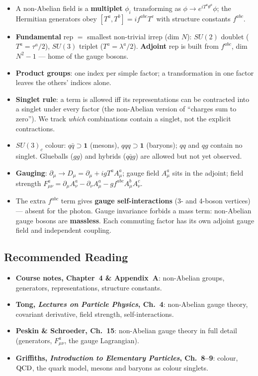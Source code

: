 \documentclass[../main.tex]{subfiles}
\begin{document}
\begin{itemize}
  \item A non-Abelian field is a \textbf{multiplet} $\phi_i$ transforming as $\phi\to e^{iT^a\theta^a}\phi$; the Hermitian generators obey $[T^a,T^b]=if^{abc}T^c$ with structure constants $f^{abc}$.
  \item \textbf{Fundamental} rep $=$ smallest non-trivial irrep (dim $N$): $SU(2)$ doublet ($T^a=\tau^a/2$), $SU(3)$ triplet ($T^a=\lambda^a/2$). \textbf{Adjoint} rep is built from $f^{abc}$, dim $N^2-1$ --- home of the gauge bosons.
  \item \textbf{Product groups}: one index per simple factor; a transformation in one factor leaves the others' indices alone.
  \item \textbf{Singlet rule}: a term is allowed iff its representations can be contracted into a singlet under every factor (the non-Abelian version of ``charges sum to zero''). We track \emph{which} combinations contain a singlet, not the explicit contractions.
  \item $SU(3)_c$ colour: $q\bar q\supset\mathbf1$ (mesons), $qqq\supset\mathbf1$ (baryons); $qq$ and $qg$ contain no singlet. Glueballs ($gg$) and hybrids ($q\bar q g$) are allowed but not yet observed.
  \item \textbf{Gauging}: $\partial_\mu\to D_\mu=\partial_\mu+igT^aA_\mu^a$; gauge field $A_\mu^a$ sits in the adjoint; field strength $F_{\mu\nu}^a=\partial_\mu A_\nu^a-\partial_\nu A_\mu^a-gf^{abc}A_\mu^bA_\nu^c$.
  \item The extra $f^{abc}$ term gives \textbf{gauge self-interactions} (3- and 4-boson vertices) --- absent for the photon. Gauge invariance forbids a mass term: non-Abelian gauge bosons are \textbf{massless}. Each commuting factor has its own adjoint gauge field and independent coupling.
\end{itemize}

\subsection*{Recommended Reading}

\begin{itemize}
  \item \textbf{Course notes, Chapter~4 \& Appendix~A}: non-Abelian groups, generators, representations, structure constants.
  \item \textbf{Tong, \textit{Lectures on Particle Physics}, Ch.~4}: non-Abelian gauge theory, covariant derivative, field strength, self-interactions.
  \item \textbf{Peskin \& Schroeder, Ch.~15}: non-Abelian gauge theory in full detail (generators, $F_{\mu\nu}^a$, the gauge Lagrangian).
  \item \textbf{Griffiths, \textit{Introduction to Elementary Particles}, Ch.~8--9}: colour, $\mathrm{QCD}$, the quark model, mesons and baryons as colour singlets.
\end{itemize}
\end{document}
